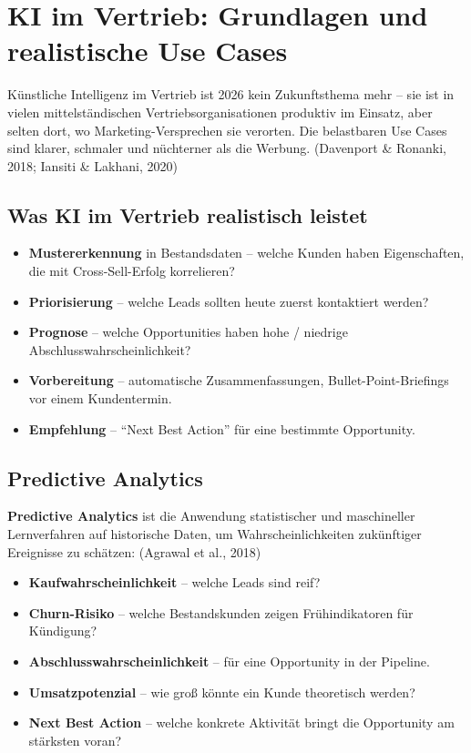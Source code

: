 \documentclass[11pt,a4paper,oneside]{article}
\newcommand{\fachbegriff}[1]{\textbf{#1}}
\newcommand{\quelle}[1]{{\footnotesize\color{lpGray}(#1)}}
\begin{document}
\section{KI im Vertrieb: Grundlagen und realistische Use Cases}

Künstliche Intelligenz im Vertrieb ist 2026 kein Zukunftsthema mehr -- sie ist in vielen mittelständischen Vertriebsorganisationen produktiv im Einsatz, aber selten dort, wo Marketing-Versprechen sie verorten. Die belastbaren Use Cases sind klarer, schmaler und nüchterner als die Werbung. \quelle{Davenport \& Ronanki, 2018; Iansiti \& Lakhani, 2020}

\subsection{Was KI im Vertrieb realistisch leistet}

\begin{itemize}
  \item \fachbegriff{Mustererkennung} in Bestandsdaten -- welche Kunden haben Eigenschaften, die mit Cross-Sell-Erfolg korrelieren?
  \item \fachbegriff{Priorisierung} -- welche Leads sollten heute zuerst kontaktiert werden?
  \item \fachbegriff{Prognose} -- welche Opportunities haben hohe / niedrige Abschlusswahrscheinlichkeit?
  \item \fachbegriff{Vorbereitung} -- automatische Zusammenfassungen, Bullet-Point-Briefings vor einem Kundentermin.
  \item \fachbegriff{Empfehlung} -- ``Next Best Action'' für eine bestimmte Opportunity.
\end{itemize}

\subsection{Predictive Analytics}

\fachbegriff{Predictive Analytics} ist die Anwendung statistischer und maschineller Lernverfahren auf historische Daten, um Wahrscheinlichkeiten zukünftiger Ereignisse zu schätzen: \quelle{Agrawal et al., 2018}

\begin{itemize}
  \item \textbf{Kaufwahrscheinlichkeit} -- welche Leads sind reif?
  \item \textbf{Churn-Risiko} -- welche Bestandskunden zeigen Frühindikatoren für Kündigung?
  \item \textbf{Abschlusswahrscheinlichkeit} -- für eine Opportunity in der Pipeline.
  \item \textbf{Umsatzpotenzial} -- wie groß könnte ein Kunde theoretisch werden?
  \item \textbf{Next Best Action} -- welche konkrete Aktivität bringt die Opportunity am stärksten voran?
\end{itemize}
\end{document}
